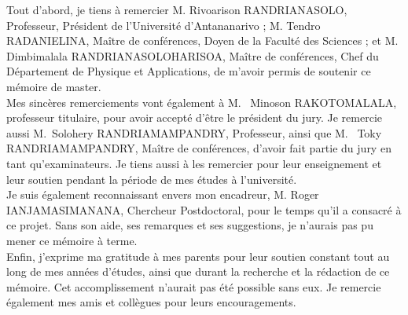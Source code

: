\indent \justifying Tout d'abord, je tiens à remercier M. Rivoarison RANDRIANASOLO, Professeur, Président de l'Université d'Antananarivo ; M. Tendro RADANIELINA, Maître de conférences, Doyen de la Faculté des Sciences ; et M. Dimbimalala RANDRIANASOLOHARISOA, Maître de conférences, Chef du Département de Physique et Applications, de m'avoir permis de soutenir ce mémoire de master.\\

\indent Mes sincères remerciements vont également à M. ~Minoson RAKOTOMALALA, professeur titulaire, pour avoir accepté d'être le président du jury. Je remercie aussi M.~Solohery \linebreak RANDRIAMAMPANDRY, Professeur, ainsi que M. ~Toky RANDRIAMAMPANDRY, Maître de conférences, d'avoir fait partie du jury en tant qu'examinateurs. Je tiens aussi à les remercier pour leur enseignement et leur soutien pendant la période de mes études à l'université.\\

\indent Je suis également reconnaissant envers mon encadreur, M. Roger IANJAMASIMANANA, Chercheur Postdoctoral, pour le temps qu'il a consacré à ce projet. Sans son aide, ses remarques et ses suggestions, je n'aurais pas pu mener ce mémoire à terme.\\

\indent Enfin, j'exprime ma gratitude à mes parents pour leur soutien constant tout au long de mes années d'études, ainsi que durant la recherche et la rédaction de ce mémoire. Cet accomplissement n'aurait pas été possible sans eux. Je remercie également mes amis et collègues pour leurs encouragements.

